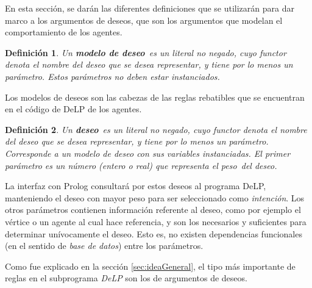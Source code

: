 \documentclass[oneside]{book}
\newtheorem{definicion}{Definición}
\begin{document}
\label{sec:argumentosDeDeseos}

En esta sección, se darán las diferentes definiciones que se utilizarán para dar marco a los
argumentos de deseos, que son los argumentos que modelan el comportamiento de los agentes.
%

\begin{definicion}
	Un \textbf{modelo de deseo}\ es un literal no negado, cuyo functor denota el nombre
	del deseo que se desea representar, y tiene por lo menos un parámetro. Estos parámetros
	no deben estar instanciados.
\end{definicion}

Los modelos de deseos son las cabezas de las reglas rebatibles que se encuentran en el código 
de DeLP de los agentes. 


\begin{definicion}
	Un \textbf{deseo}\ es un literal no negado, cuyo functor denota el nombre
	del deseo que se desea representar, y tiene por lo menos un parámetro. Corresponde a un
	modelo de deseo con sus variables instanciadas. El primer parámetro es un número (entero 
	o real) que representa el 
	\emph{peso}\ del deseo.
\end{definicion}

La interfaz con Prolog consultará por estos deseos al programa DeLP, manteniendo el deseo con
mayor peso para ser seleccionado como \emph{intención}. Los otros parámetros contienen 
información referente al deseo, como por ejemplo el vértice o un agente al cual hace 
referencia, y son los necesarios y suficientes para determinar unívocamente el deseo. Esto 
es, no existen dependencias funcionales (en el sentido de \emph{base de datos}) entre los 
parámetros.


Como fue explicado en la sección \ref{sec:ideaGeneral}, el tipo más importante de 
reglas en el subprograma \textit{DeLP} son los de argumentos de deseos. 
\end{document}
